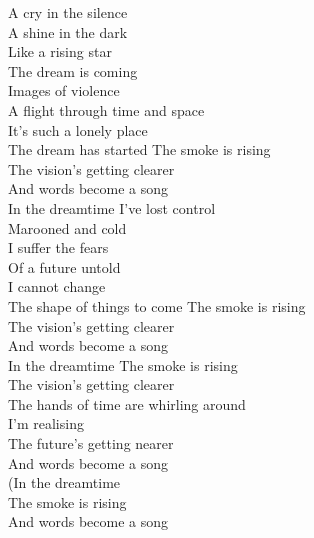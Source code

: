 
A cry in the silence\\
A shine in the dark\\
Like a rising star\\
The dream is coming\\
Images of violence \\
A flight through time and space\\
It's such a lonely place\\
The dream has started
\hops
{} The smoke is rising\\
 The vision's getting clearer\\
 And words become a song\\
 In the dreamtime
\hops
I've lost control\\
Marooned and cold\\
I suffer the fears\\
Of a future untold\\
I cannot change\\
The shape of things to come
\hops
{} The smoke is rising\\
 The vision's getting clearer\\
 And words become a song\\
 In the dreamtime
\hops
{} The smoke is rising\\
 The vision's getting clearer\\
 The hands of time are whirling around\\
 I'm realising\\
 The future's getting nearer\\
 And words become a song\\
 (In the dreamtime\\
 The smoke is rising\\
 And words become a song

\clearpage
{}

